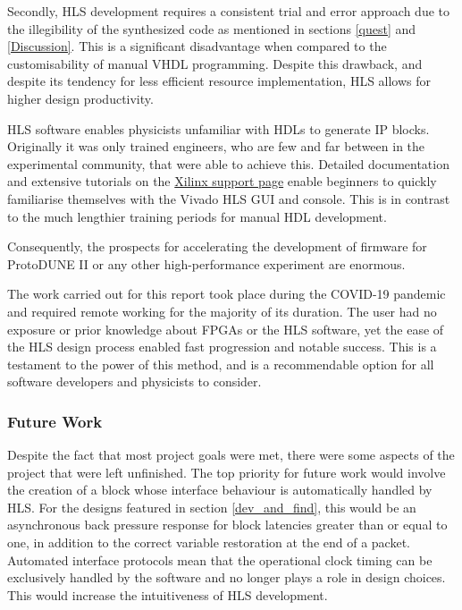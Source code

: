 \documentclass[10pt]{article}
\begin{document}
Secondly, HLS development requires a consistent trial and error approach due to the illegibility of the synthesized code as mentioned in sections \ref{quest} and \ref{Discussion}. This is a significant disadvantage when compared to the customisability of manual VHDL programming. Despite this drawback, and despite its tendency for less efficient resource implementation, HLS allows for higher design productivity.

HLS software enables physicists unfamiliar with HDLs to generate IP blocks. Originally it was only trained engineers, who are few and far between in the experimental community, that were able to achieve this. Detailed documentation and extensive tutorials on the \href{https://www.xilinx.com/support.html}{Xilinx support page} enable beginners to quickly familiarise themselves with the Vivado HLS GUI and console. This is in contrast to the much lengthier training periods for manual HDL development.

Consequently, the prospects for accelerating the development of firmware for ProtoDUNE II or any other high-performance experiment are enormous.

The work carried out for this report took place during the COVID-19 pandemic and required remote working for the majority of its duration. The user had no exposure or prior knowledge about FPGAs or the HLS software, yet the ease of the HLS design process enabled fast progression and notable success. This is a testament to the power of this method, and is a recommendable option for all software developers and physicists to consider.

\subsubsection{Future Work}

Despite the fact that most project goals were met, there were some aspects of the project that were left unfinished. The top priority for future work would involve the creation of a block whose interface behaviour is automatically handled by HLS. For the designs featured in section \ref{dev_and_find}, this would be an asynchronous back pressure response for block latencies greater than or equal to one, in addition to the correct variable restoration at the end of a packet. Automated interface protocols mean that the operational clock timing can be exclusively handled by the software and no longer plays a role in design choices. This would increase the intuitiveness of HLS development.
\end{document}
